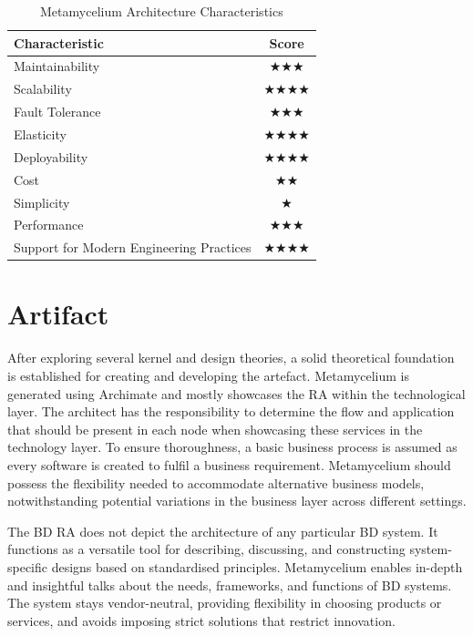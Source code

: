 \documentclass[preprint,12pt]{elsarticle}
\begin{document}
\begin{table}[t]
  \centering
  \caption{Metamycelium Architecture Characteristics}
  \label{tab:architecture-characteristics}
  \begin{tabular}{|l|c|}
    \hline
    \textbf{Characteristic} & \textbf{Score} \\
    \hline
    Maintainability & $\bigstar\bigstar\bigstar$ \\
    \hline
    Scalability & $\bigstar\bigstar\bigstar\bigstar$ \\
    \hline
    Fault Tolerance & $\bigstar\bigstar\bigstar$ \\
    \hline
    Elasticity & $\bigstar\bigstar\bigstar\bigstar$ \\
    \hline
    Deployability & $\bigstar\bigstar\bigstar\bigstar$ \\
    \hline
    Cost & $\bigstar\bigstar$ \\
    \hline
    Simplicity & $\bigstar$ \\
    \hline
    Performance & $\bigstar\bigstar\bigstar$ \\
    \hline
    Support for Modern Engineering Practices & $\bigstar\bigstar\bigstar\bigstar$ \\
    \hline
  \end{tabular}
\end{table}







\section{Artifact}
\label{sec:artifact}

After exploring several kernel and design theories, a solid theoretical foundation is established for creating and developing the artefact. Metamycelium is generated using Archimate and mostly showcases the RA within the technological layer. The architect has the responsibility to determine the flow and application that should be present in each node when showcasing these services in the technology layer. To ensure thoroughness, a basic business process is assumed as every software is created to fulfil a business requirement. Metamycelium should possess the flexibility needed to accommodate alternative business models, notwithstanding potential variations in the business layer across different settings.

The BD RA does not depict the architecture of any particular BD system. It functions as a versatile tool for describing, discussing, and constructing system-specific designs based on standardised principles. Metamycelium enables in-depth and insightful talks about the needs, frameworks, and functions of BD systems. The system stays vendor-neutral, providing flexibility in choosing products or services, and avoids imposing strict solutions that restrict innovation. 
\end{document}
